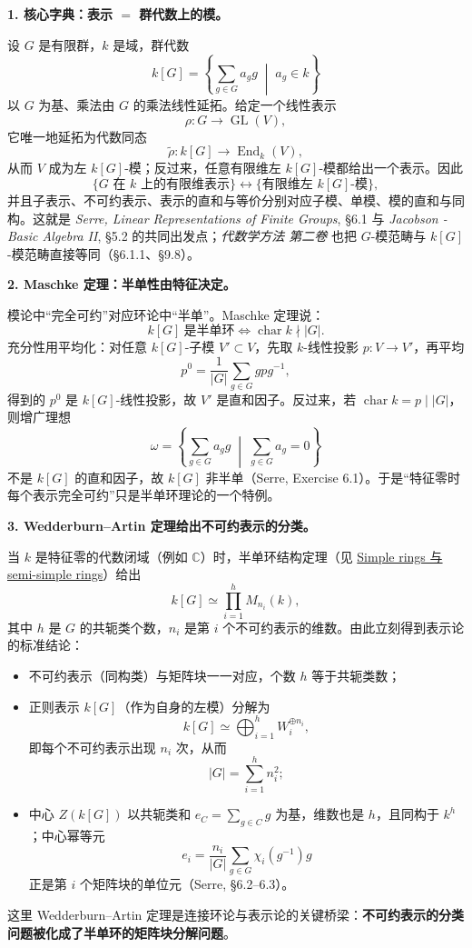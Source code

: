 \documentclass[a4paper]{ctexart}
\theoremstyle{definition}
\theoremstyle{analysis}
\theoremstyle{plain}
\begin{document}
\medskip
\textbf{1. 核心字典：表示 \(=\) 群代数上的模。}

设 \(G\) 是有限群，\(k\) 是域，群代数
\[
  k[G]=\left\{\sum_{g\in G}a_g g\;\middle|\;a_g\in k\right\}
\]
以 \(G\) 为基、乘法由 \(G\) 的乘法线性延拓。给定一个线性表示
\[
  \rho:G\longrightarrow \operatorname{GL}(V),
\]
它唯一地延拓为代数同态
\[
  \widetilde\rho:k[G]\longrightarrow \operatorname{End}_k(V),
\]
从而 \(V\) 成为左 \(k[G]\)-模；反过来，任意有限维左 \(k[G]\)-模都给出一个表示。因此
\[
  \{\text{\(G\) 在 \(k\) 上的有限维表示}\}
  \longleftrightarrow
  \{\text{有限维左 \(k[G]\)-模}\},
\]
并且子表示、不可约表示、表示的直和与等价分别对应子模、单模、模的直和与同构。这就是 \textit{Serre, Linear Representations of Finite Groups}, \S 6.1 与 \textit{Jacobson - Basic Algebra II}, \S 5.2 的共同出发点；\textit{代数学方法 第二卷} 也把 \(G\)-模范畴与 \(k[G]\)-模范畴直接等同（\S 6.1.1、\S 9.8）。

\medskip
\textbf{2. Maschke 定理：半单性由特征决定。}

模论中“完全可约”对应环论中“半单”。Maschke 定理说：
\[
  k[G]\ \text{是半单环}
  \iff
  \operatorname{char}k\nmid |G|.
\]
充分性用平均化：对任意 \(k[G]\)-子模 \(V'\subset V\)，先取 \(k\)-线性投影 \(p:V\to V'\)，再平均
\[
  p^0=\frac1{|G|}\sum_{g\in G}gpg^{-1},
\]
得到的 \(p^0\) 是 \(k[G]\)-线性投影，故 \(V'\) 是直和因子。反过来，若 \(\operatorname{char}k=p\mid |G|\)，则增广理想
\[
  \omega=\left\{\sum_{g\in G}a_g g\;\middle|\;\sum_{g\in G}a_g=0\right\}
\]
不是 \(k[G]\) 的直和因子，故 \(k[G]\) 非半单（Serre, Exercise 6.1）。于是“特征零时每个表示完全可约”只是半单环理论的一个特例。

\medskip
\textbf{3. Wedderburn--Artin 定理给出不可约表示的分类。}

当 \(k\) 是特征零的代数闭域（例如 \(\mathbb C\)）时，半单环结构定理（见 \hyperref[subsec:topic-simple-semisimple-rings]{Simple rings 与 semi-simple rings}）给出
\[
  k[G]\simeq \prod_{i=1}^{h} M_{n_i}(k),
\]
其中 \(h\) 是 \(G\) 的共轭类个数，\(n_i\) 是第 \(i\) 个不可约表示的维数。由此立刻得到表示论的标准结论：
\begin{itemize}
  \item 不可约表示（同构类）与矩阵块一一对应，个数 \(h\) 等于共轭类数；
  \item 正则表示 \(k[G]\)（作为自身的左模）分解为
  \[
    k[G]\simeq \bigoplus_{i=1}^{h} W_i^{\oplus n_i},
  \]
  即每个不可约表示出现 \(n_i\) 次，从而
  \[
    |G|=\sum_{i=1}^{h} n_i^2;
  \]
  \item 中心 \(Z(k[G])\) 以共轭类和 \(e_C=\sum_{g\in C}g\) 为基，维数也是 \(h\)，且同构于 \(k^h\)；中心幂等元
  \[
    e_i=\frac{n_i}{|G|}\sum_{g\in G}\chi_i(g^{-1})g
  \]
  正是第 \(i\) 个矩阵块的单位元（Serre, \S 6.2--6.3）。
\end{itemize}
这里 Wedderburn--Artin 定理是连接环论与表示论的关键桥梁：\textbf{不可约表示的分类问题被化成了半单环的矩阵块分解问题}。
\end{document}
